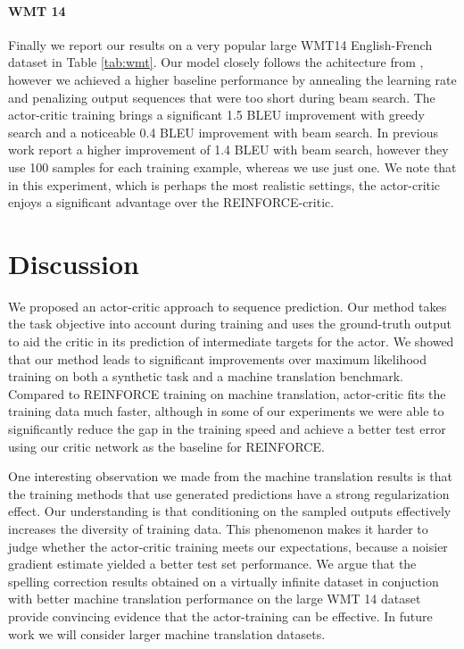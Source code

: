 \documentclass{article} \usepackage{iclr2017_conference,times}
\begin{document}
\paragraph{WMT 14}
Finally we report our results on a very popular
large WMT14 
English-French dataset \citep{cho2014learning} in Table \ref{tab:wmt}. Our
model closely follows the
achitecture from \citep{bahdanau2015neural}, however we achieved a higher
baseline performance by annealing the learning rate  and penalizing 
output sequences that were too short during beam search. The actor-critic training brings a
significant 1.5 BLEU improvement with greedy search and a noticeable 0.4 BLEU
improvement with beam search. In previous work \cite{shen2015minimum}
report a higher improvement of 1.4 BLEU with beam search, however they use 100
samples for each training example, whereas we use just one. We note that in this experiment, which is perhaps the most realistic settings, the actor-critic enjoys a significant advantage over the REINFORCE-critic.


\section{Discussion}
\label{sec:discuss}

We proposed an actor-critic approach to sequence prediction. Our method takes
the task objective into account during training and uses the ground-truth output to aid
the critic in its prediction of intermediate targets for the actor. We showed that our method leads to
significant improvements over maximum likelihood training on both a synthetic task
and a machine translation benchmark. Compared to REINFORCE training on machine translation,
actor-critic fits the training data much faster, although in some of our
experiments we were able to significantly reduce the gap in the training speed and
achieve a better test error using our critic network as the baseline for
REINFORCE.



One interesting observation we made from the machine translation results is
that the training methods that use generated predictions have a strong
regularization effect. Our understanding is that conditioning on the sampled
outputs effectively increases the diversity of training data. This phenomenon
makes it harder to judge whether the actor-critic training meets our
expectations, because a noisier gradient estimate yielded a better test set
performance. We argue that the spelling correction results obtained on
a virtually infinite dataset in conjuction with better machine translation
performance on the large WMT 14 dataset provide convincing evidence that the
actor-training can be effective. In future work we will consider larger
machine translation datasets.
\end{document}
